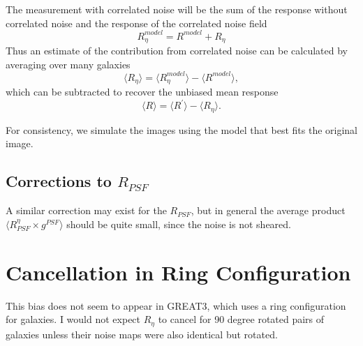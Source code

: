 \documentclass[usegraphicx,usenatbib]{mn2e}
\begin{document}
The measurement with correlated noise will be the sum of the response
without correlated noise and the response of the correlated noise field
\begin{equation}
    R^{model}_\eta = R^{model} + R_\eta
\end{equation}
Thus an estimate of the contribution from correlated noise can
be calculated by averaging over many galaxies
\begin{equation}
    \langle R_\eta \rangle = \langle R^{model}_\eta \rangle - \langle R^{model} \rangle,
\end{equation}
which can be subtracted to recover the unbiased mean response
\begin{equation}
    \langle R \rangle = \langle R^\prime \rangle - \langle R_\eta \rangle.
\end{equation}

For consistency, we simulate the images using the model that best fits the
original image.

\subsection{Corrections to $R_{PSF}$}

A similar correction may exist for the $R_{PSF}$, but in general the average
product $\langle R_{PSF}^\eta\times g^{PSF}\rangle$ should be quite small,
since the noise is not sheared.

\section{Cancellation in Ring Configuration}

This bias does not seem to appear in GREAT3, which uses a ring configuration
for galaxies.  I would not expect $R_\eta$ to cancel for 90 degree rotated
pairs of galaxies unless their noise maps were also identical but rotated.




\end{document}
